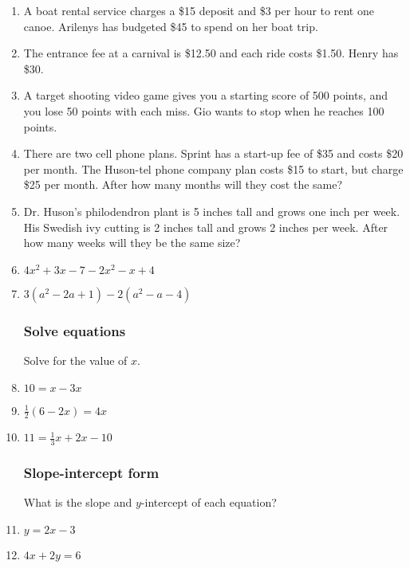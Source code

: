\documentclass[12pt, oneside]{article}
\begin{document}
\begin{enumerate}
  \item A boat rental service charges a \$15 deposit and \$3 per hour to rent one canoe. Arilenys has budgeted \$45 to spend on her boat trip.

\newpage
  \item The entrance fee at a carnival is \$12.50 and each ride costs \$1.50. Henry has \$30. \vspace{8cm}

  \item A target shooting video game gives you a starting score of 500 points, and you lose 50 points with each miss. Gio wants to stop when he reaches 100 points.

\newpage
  \item There are two cell phone plans. Sprint has a start-up fee of \$35 and costs \$20 per month. The Huson-tel phone company plan costs \$15 to start, but charge \$25 per month. After how many months will they cost the same?  \vspace{8cm}

  \item Dr. Huson's philodendron plant is 5 inches tall and grows one inch per week. His Swedish ivy cutting is 2 inches tall and grows 2 inches per week. After how many weeks will they be the same size?

\newpage
  \item $4x^2+3x -7 -2x^2-x+4$ \vspace{3cm}
  \item $3(a^2-2a +1) -2(a^2-a-4)$ \vspace{3cm}

\subsubsection*{Solve equations}

Solve for the value of $x$.
\item   $10=x-3x$ \vspace{3cm}
\item   $\frac{1}{2}(6-2x)=4x$ \vspace{3cm}
\item   $11=\frac{1}{3}x+2x-10$ \vspace{3cm}


\subsubsection*{Slope-intercept form}

What is the slope and $y$-intercept of each equation?
\item   $y=2x-3$ \vspace{2cm}
\item   $4x+2y=6$ \vspace{3cm}



\end{enumerate}
\end{document}
